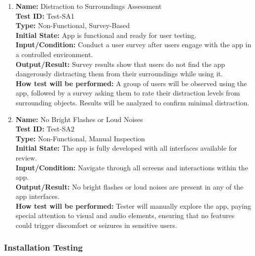 \documentclass[12pt, titlepage]{article}
\begin{document}
\begin{enumerate}
\begin{enumerate}
    \item \textbf{Name:} Distraction to Surroundings Assessment \label{itm:Test-SA1} \\
    \textbf{Test ID:} Test-SA1 \\
    \textbf{Type:} Non-Functional, Survey-Based \\
    \textbf{Initial State:} App is functional and ready for user testing. \\
    \textbf{Input/Condition:} Conduct a user survey after users engage with the app in a controlled environment. \\
    \textbf{Output/Result:} Survey results show that users do not find the app dangerously distracting them from their surroundings while using it. \\
    \textbf{How test will be performed:} A group of users will be observed using the app, followed by a survey asking them to rate their distraction levels from surrounding objects. Results will be analyzed to confirm minimal distraction.

    \item \textbf{Name:} No Bright Flashes or Loud Noises \label{itm:Test-SA2} \\
    \textbf{Test ID:} Test-SA2 \\
    \textbf{Type:} Non-Functional, Manual Inspection \\
    \textbf{Initial State:} The app is fully developed with all interfaces available for review. \\
    \textbf{Input/Condition:} Navigate through all screens and interactions within the app. \\
    \textbf{Output/Result:} No bright flashes or loud noises are present in any of the app interfaces. \\
    \textbf{How test will be performed:} Tester will manually explore the app, paying special attention to visual and audio elements, ensuring that no features could trigger discomfort or seizures in sensitive users.
\end{enumerate}

\subsubsection{Installation Testing}


\end{enumerate}
\end{document}
